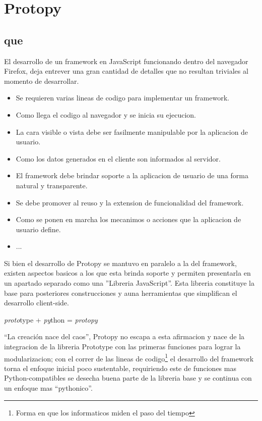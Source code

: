 
\chapter{Protopy}

\section{que}
El desarrollo de un framework en JavaScript funcionando dentro del navegador
Firefox, deja entrever una gran cantidad de detalles que no resultan triviales
al momento de desarrollar.
\begin{itemize}
 \item Se requieren varias lineas de codigo para implementar un framework.
 \item Como llega el codigo al navegador y se inicia su ejecucion.
 \item La cara visible o vista debe ser fasilmente manipulable por la aplicacion
de usuario.
 \item Como los datos generados en el cliente son informados al servidor.
 \item El framework debe brindar soporte a la aplicacion de usuario de una forma
natural y transparente.
 \item Se debe promover al reuso y la extension de funcionalidad del framework.
 \item Como se ponen en marcha los mecanimos o acciones que la aplicacion de
usuario define.
 \item ...
\end{itemize} 
Si bien el desarrollo de Protopy se mantuvo en paralelo a la del
framework, existen aspectos basicos a los que esta brinda soporte y permiten
presentarla en un apartado separado como una ''Libreria JavaScript''. Esta
libreria constituye la base para posteriores construcciones y auna
herramientas que simplifican el desarrollo client-side.

\textit{proto}type + \textit{py}thon = \textit{protopy}

``La creación nace del caos'', Protopy no escapa a esta afirmacion y nace de la
integracion de la libreria Prototype con las primeras funciones para lograr
la modularizacion; con el correr de las lineas de codigo\footnote{Forma en que
los informaticos miden el paso del tiempo} el desarrollo del framework torna
el enfoque inicial poco sustentable, requiriendo este de funciones mas
Python-compatibles se desecha buena parte de la libreria base y se continua con
un enfoque mas ``pythonico''.

